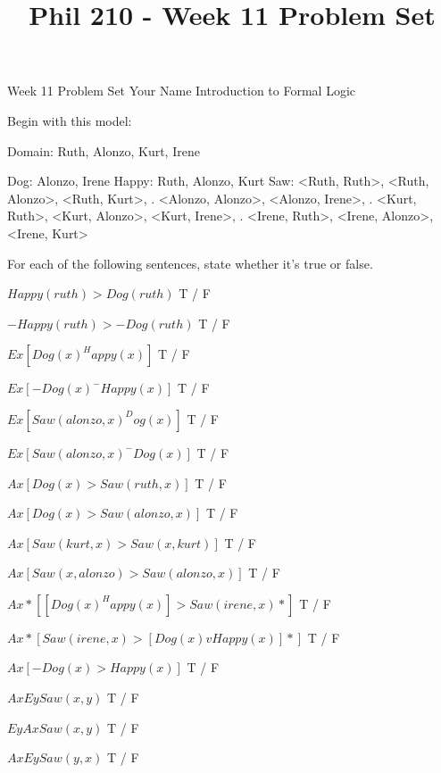 
\title{Phil 210 - Week 11 Problem Set}

\heading
Week 11 Problem Set
Your Name
Introduction to Formal Logic
\endheading

Begin with this model:

\answer
	\firstordermodel 
	Domain: Ruth, Alonzo, Kurt, Irene

	Dog:    Alonzo, Irene
	Happy:  Ruth, Alonzo, Kurt
	Saw:    <Ruth, Ruth>, <Ruth, Alonzo>, <Ruth, Kurt>,
	   .    <Alonzo, Alonzo>, <Alonzo, Irene>,
	   .    <Kurt, Ruth>, <Kurt, Alonzo>, <Kurt, Irene>,
	   .    <Irene, Ruth>, <Irene, Alonzo>, <Irene, Kurt>
	\endfirstordermodel
\endanswer\bigskip

For each of the following sentences, state whether it's true or false.

\quantifiers
\problems
{}
$ Happy(ruth) > Dog(ruth) $
	\answer
	 T / F
	\endanswer

$ -Happy(ruth) > -Dog(ruth) $
	\answer
	 T / F
	\endanswer

$ Ex[Dog(x) ^ Happy(x)] $
	\answer
	 T / F
	\endanswer

$ Ex[-Dog(x) ^ -Happy(x)] $
	\answer
	 T / F
	\endanswer

$ Ex[Saw(alonzo,x) ^ Dog(x)] $
	\answer
	 T / F
	\endanswer

$ Ex[Saw(alonzo,x) ^ -Dog(x)] $
	\answer
	 T / F
	\endanswer

$ Ax[Dog(x) > Saw(ruth,x)] $
	\answer
	 T / F
	\endanswer

$ Ax[Dog(x) > Saw(alonzo,x)] $
	\answer
	 T / F
	\endanswer

$ Ax[Saw(kurt,x) > Saw(x,kurt)] $
	\answer
	 T / F
	\endanswer

$ Ax[Saw(x,alonzo) > Saw(alonzo,x)] $
	\answer
	 T / F
	\endanswer

$ Ax*[[Dog(x) ^ Happy(x)] > Saw(irene,x)*] $
	\answer
	 T / F
	\endanswer

$ Ax*[Saw(irene,x) > [Dog(x) v Happy(x)]*] $
	\answer
	 T / F
	\endanswer

$ Ax[-Dog(x) > Happy(x)] $
	\answer
	 T / F
	\endanswer

$ Ax Ey Saw(x,y) $
	\answer
	 T / F
	\endanswer

$ Ey Ax Saw(x,y) $
	\answer
	 T / F
	\endanswer

$ Ax Ey Saw(y,x) $
	\answer
	 T / F
	\endanswer

